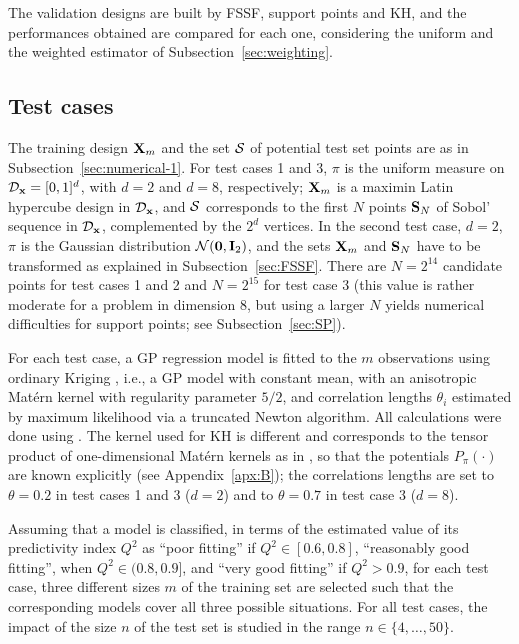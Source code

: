 The validation designs are built by FSSF, support points and KH, and the performances obtained are compared for each one, considering the uniform and the weighted estimator of Subsection~\ref{sec:weighting}. 

\subsection{Test cases} \label{sec:testCases}

The training design ${\bf X}_m$ and the set $\mathcal{S}$ of potential test set points are as in Subsection~\ref{sec:numerical-1}. 
For test cases 1 and 3, $\pi$ is the uniform measure on $\mathcal{D}_{\bf x}=[0,1]^d$, with $d=2$ and $d=8$, respectively; ${\bf X}_m$ is a maximin Latin hypercube design in $\mathcal{D}_{\bf x}$, and $\mathcal{S}$ corresponds to the first $N$ points $\mathbf{S}_N$ of Sobol' sequence in $\mathcal{D}_{\bf x}$, complemented by the $2^d$ vertices. 
In the second test case, $d=2$, $\pi$ is the Gaussian distribution $\SN(\0b,\Ib_2)$, and the sets ${\bf X}_m$ and $\mathbf{S}_N$ have to be transformed as explained in Subsection~\ref{sec:FSSF}. 
There are $N=2^{14}$ candidate points for test cases 1 and 2 and $N=2^{15}$ for test case 3 (this value is rather moderate for a problem in dimension 8, but using a larger $N$ yields numerical difficulties for support points; see Subsection~\ref{sec:SP}). 

For each test case, a GP regression model is fitted to the $m$ observations using ordinary Kriging \citep{rasmussen_2006}, i.e., a GP model with constant mean, with an anisotropic Mat\'{e}rn kernel with regularity parameter $5/2$, and correlation lengths $\theta_i$ estimated by maximum likelihood via a truncated Newton algorithm. 
All calculations were done using \ot \citep{baudin_dutfoy_2017}. 
The kernel used for KH is different and corresponds to the tensor product of one-dimensional Mat\'{e}rn kernels as in , so that the potentials $P_{\pi}(\cdot)$ are known explicitly (see Appendix~\ref{apx:B}); the correlations lengths are set to $\theta=0.2$ in test cases 1 and 3 ($d=2$) and to $\theta=0.7$ in test case 3 ($d=8$).

Assuming that a model is classified, in terms of the estimated value of its predictivity index $Q^2$ as ``poor fitting'' if $Q^2\in[0.6, 0.8]$, ``reasonably good fitting'', when $Q^2\in(0.8,0.9]$, and ``very good fitting'' if $Q^2>0.9$, for each test case, three different sizes $m$ of the training set are selected such that the corresponding models cover all three possible situations. 
For all test cases, the impact of the size $n$ of the test set is studied in the range $n\in\{4,\ldots,50\}$.

